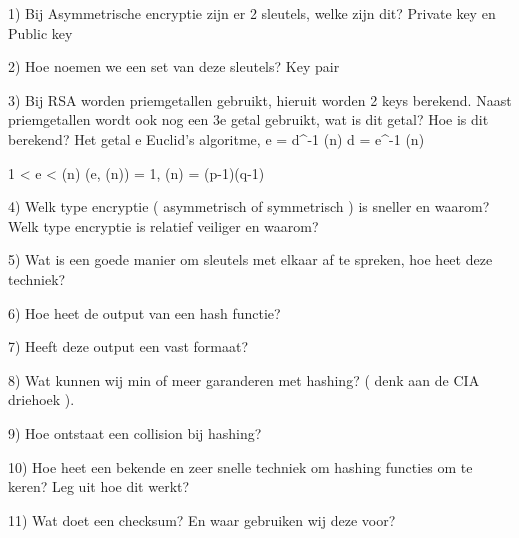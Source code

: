 1) Bij Asymmetrische encryptie zijn er 2 sleutels, welke zijn dit? 
Private key en Public key
 
2) Hoe noemen we een set van deze sleutels? 
Key pair
 
3) Bij RSA worden priemgetallen gebruikt, hieruit worden 2 keys berekend. Naast 
priemgetallen wordt ook nog een 3e getal gebruikt, wat is dit getal? Hoe is dit 
berekend? 
Het getal e
Euclid's algoritme, e = d^{-1} \mod \varphi(n) \quad {} \quad d = e^{-1} \mod \varphi(n) \quad {} \quad

1 < e < \varphi(n) \quad {} \quad \gcd(e, \varphi(n)) = 1, \quad {} \quad \varphi(n) = (p-1)(q-1)
 
4) Welk type encryptie ( asymmetrisch of symmetrisch ) is sneller en waarom? Welk 
type encryptie is relatief veiliger en waarom? 
 
5) Wat is een goede manier om sleutels met elkaar af te spreken, hoe heet deze 
techniek?  
 
6) Hoe heet de output van een hash functie? 
 
7) Heeft deze output een vast formaat? 
 
8) Wat kunnen wij min of meer garanderen met hashing? ( denk aan de CIA driehoek ). 
 
9) Hoe ontstaat een collision bij hashing? 
 
10) Hoe heet een bekende en zeer snelle techniek om hashing functies om te keren? Leg 
uit hoe dit werkt? 
 
11) Wat doet een checksum? En waar gebruiken wij deze voor? 
